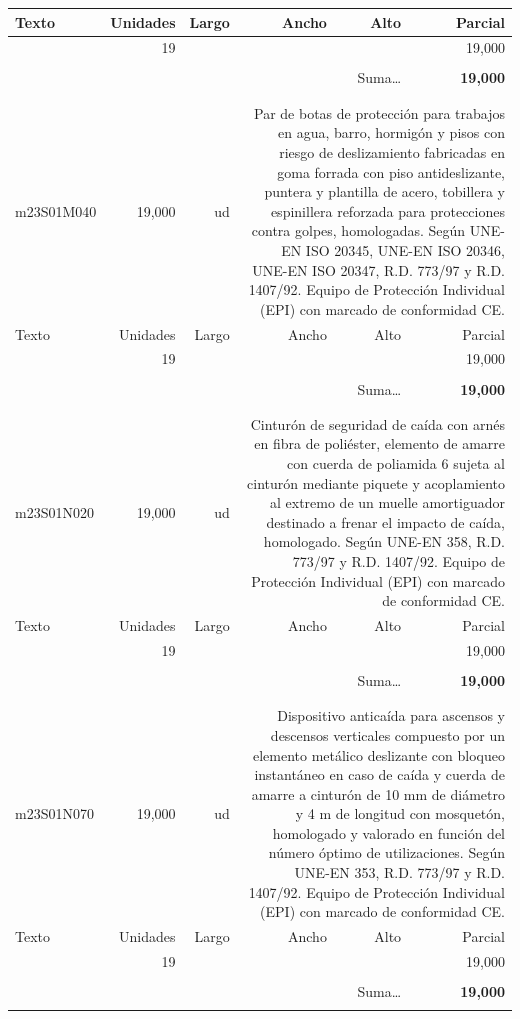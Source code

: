 \documentclass{book}%
\begin{document}
\begin{longtable}{lrrrrr}
Texto&Unidades&Largo&Ancho&Alto&Parcial\\%
\hline%
\multicolumn{1}{p{3.5cm}}{ }&19&&&&    19,000\\%
&&&&&\\%
\multicolumn{5}{r}{Suma\ldots}&\textbf{    19,000}\\%
\hline%
&&&&&\\%
&&&&&\\%
m23S01M040&    19,000& ud&\multicolumn{3}{p{6cm}}{\scriptsize Par de botas de protección para trabajos en agua, barro, hormigón y pisos con riesgo de deslizamiento fabricadas en goma forrada con piso antideslizante, puntera y plantilla de acero, tobillera y espinillera reforzada para protecciones contra golpes, homologadas. Según UNE-EN ISO 20345, UNE-EN ISO 20346, UNE-EN ISO 20347, R.D. 773/97 y R.D. 1407/92. Equipo de Protección Individual (EPI) con marcado de conformidad CE.\normalsize}\\%
Texto&Unidades&Largo&Ancho&Alto&Parcial\\%
\hline%
\multicolumn{1}{p{3.5cm}}{ }&19&&&&    19,000\\%
&&&&&\\%
\multicolumn{5}{r}{Suma\ldots}&\textbf{    19,000}\\%
\hline%
&&&&&\\%
&&&&&\\%
m23S01N020&    19,000& ud&\multicolumn{3}{p{6cm}}{\scriptsize Cinturón de seguridad de caída con arnés en fibra de poliéster, elemento de amarre con cuerda de poliamida 6 sujeta al cinturón mediante piquete y acoplamiento al extremo de un muelle amortiguador destinado a frenar el impacto de caída, homologado. Según UNE-EN 358, R.D. 773/97 y R.D. 1407/92. Equipo de Protección Individual (EPI) con marcado de conformidad CE.\normalsize}\\%
Texto&Unidades&Largo&Ancho&Alto&Parcial\\%
\hline%
\multicolumn{1}{p{3.5cm}}{ }&19&&&&    19,000\\%
&&&&&\\%
\multicolumn{5}{r}{Suma\ldots}&\textbf{    19,000}\\%
\hline%
&&&&&\\%
&&&&&\\%
m23S01N070&    19,000& ud&\multicolumn{3}{p{6cm}}{\scriptsize Dispositivo anticaída para ascensos y descensos verticales compuesto por un elemento metálico deslizante con bloqueo instantáneo en caso de caída y cuerda de amarre a cinturón de 10 mm de diámetro y 4 m de longitud con mosquetón, homologado y valorado en función del número óptimo de utilizaciones. Según UNE-EN 353, R.D. 773/97 y R.D. 1407/92. Equipo de Protección Individual (EPI) con marcado de conformidad CE.\normalsize}\\%
Texto&Unidades&Largo&Ancho&Alto&Parcial\\%
\hline%
\multicolumn{1}{p{3.5cm}}{ }&19&&&&    19,000\\%
&&&&&\\%
\multicolumn{5}{r}{Suma\ldots}&\textbf{    19,000}\\%
\hline%
&&&&&\\%
\end{longtable}%
\newpage
\end{document}

